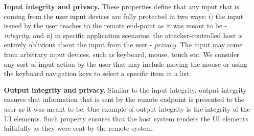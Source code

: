 \begin{mylist}
  \item \textbf{Input integrity and privacy.} These properties define that any input that is coming from the user input devices are fully protected in two ways: i) the input issued by the user reaches to the remote end-point as it was meant to be - \emph{integrity}, and ii) in specific application scenarios, the attacker-controlled host is entirely oblivious about the input from the user - \emph{privacy}. The input may come from arbitrary input devices, such as keyboard, mouse, touch etc. We consider any sort of input action by the user that may include moving the mouse or using the keyboard navigation keys to select a specific item in a list.
  
  
  \item \textbf{Output integrity and privacy.} Similar to the input integrity, output integrity ensures that information that is sent by the remote endpoint is presented to the user as it was meant to be. One example of output integrity is the integrity of the UI elements. Such property ensures that the host system renders the UI elements faithfully as they were sent by the remote system. 
  \end{mylist}



\iffalse
\myparagraph{Advantages}

\begin{enumerate}
  \item The \device does not need to know the formatting/template of the page. As the \device only looks to the current mouse position, the structure of the page is somewhat irrelevant (?).
\end{enumerate}
\fi

